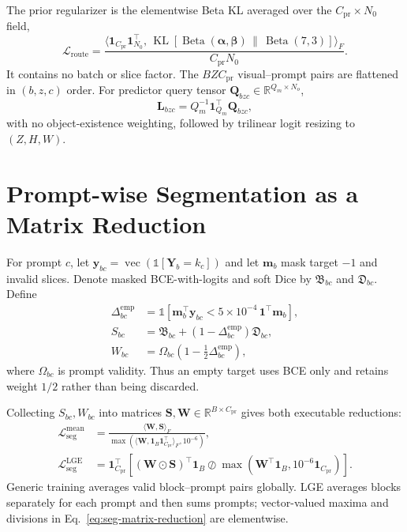 \documentclass[10pt]{article}
\newcommand{\R}{\mathbb{R}}
\newcommand{\cL}{\mathcal{L}}
\newcommand{\ones}{\bm{1}}
\newcommand{\KL}{\operatorname{KL}}
\newcommand{\ind}{\mathbb{1}}
\newcommand{\balpha}{\bm{\alpha}}
\newcommand{\bbeta}{\bm{\beta}}
\begin{document}
The prior regularizer is the elementwise Beta KL averaged over the
$C_{\mathrm{pr}}\times N_0$ field,
\begin{equation}
 \cL_{\mathrm{route}}
 =\frac{
  \langle\ones_{C_{\mathrm{pr}}}\ones_{N_0}^\top,\,
  \KL[\operatorname{Beta}(\balpha,\bbeta)
  \,\|\,\operatorname{Beta}(7,3)]\rangle_F}
 {C_{\mathrm{pr}}N_0}.
 \label{eq:route-matrix-kl}
\end{equation}
It contains no batch or slice factor.  The $BZC_{\mathrm{pr}}$ visual--prompt
pairs are flattened in $(b,z,c)$ order.  For predictor query tensor
$\bm Q_{bzc}\in\R^{Q_m\times N_o}$,
\[
 \bm L_{bzc}=Q_m^{-1}\ones_{Q_m}^\top\bm Q_{bzc},
\]
with no object-existence weighting, followed by trilinear logit resizing to
$(Z,H,W)$.

\section{Prompt-wise Segmentation as a Matrix Reduction}

For prompt $c$, let
$\bm y_{bc}=\operatorname{vec}(\ind[\bm Y_b=k_c])$ and let $\bm m_b$ mask
target $-1$ and invalid slices.  Denote masked BCE-with-logits and soft Dice by
$\mathfrak B_{bc}$ and $\mathfrak D_{bc}$.  Define
\begin{equation}
\begin{aligned}
 \Delta^{\mathrm{emp}}_{bc}
 &=\ind\!\left[
 \bm m_b^\top\bm y_{bc}
 <5\times10^{-4}\,\ones^\top\bm m_b\right],\\
 S_{bc}
 &=\mathfrak B_{bc}
 +(1-\Delta^{\mathrm{emp}}_{bc})\mathfrak D_{bc},\\
 W_{bc}
 &=\Omega_{bc}\left(1-\tfrac12\Delta^{\mathrm{emp}}_{bc}\right),
\end{aligned}
\label{eq:pair-matrix}
\end{equation}
where $\Omega_{bc}$ is prompt validity.  Thus an empty target uses BCE only and
retains weight $1/2$ rather than being discarded.

Collecting $S_{bc},W_{bc}$ into matrices
$\bm S,\bm W\in\R^{B\times C_{\mathrm{pr}}}$ gives
both executable reductions:
\begin{equation}
\boxed{
\begin{aligned}
 \cL_{\mathrm{seg}}^{\mathrm{mean}}
 &=\frac{\langle\bm W,\bm S\rangle_F}
 {\max(\langle\bm W,
 \ones_B\ones_{C_{\mathrm{pr}}}^\top\rangle_F,10^{-6})},\\
 \cL_{\mathrm{seg}}^{\mathrm{LGE}}
 &=\ones_{C_{\mathrm{pr}}}^\top\left[
  (\bm W\odot\bm S)^\top\ones_B
  \oslash\max(\bm W^\top\ones_B,
  10^{-6}\ones_{C_{\mathrm{pr}}})\right].
\end{aligned}}
\label{eq:seg-matrix-reduction}
\end{equation}
Generic training averages valid block--prompt pairs globally.  LGE averages
blocks separately for each prompt and then sums prompts; vector-valued maxima
and divisions in Eq.~\eqref{eq:seg-matrix-reduction} are elementwise.
\end{document}
